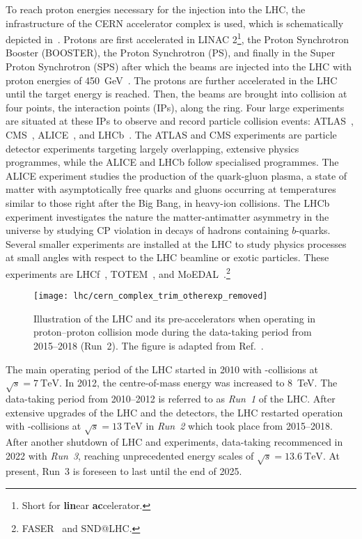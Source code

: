 To reach proton energies necessary for the injection into the LHC, the
infrastructure of the CERN accelerator complex is used, which is schematically
depicted in~. Protons are first accelerated
in LINAC 2\footnote{Short for \textbf{lin}ear \textbf{ac}celerator.}, the Proton
Synchrotron Booster (BOOSTER), the Proton Synchrotron (PS), and finally in the
Super Proton Synchrotron (SPS) after which the beams are injected into the LHC
with proton energies of \SI{450}{\GeV}~\cite{Evans:2008zzb}. The protons are
further accelerated in the LHC until the target energy is reached. Then, the
beams are brought into collision at four points, the interaction points (IPs),
along the ring. Four large experiments are situated at these IPs to observe and
record particle collision events: ATLAS~\cite{PERF-2007-01},
CMS~\cite{CMS-CMS-00-001}, ALICE~\cite{ALICE:2008ngc}, and
LHCb~\cite{LHCb:2008vvz}. The ATLAS and CMS experiments are particle detector
experiments targeting largely overlapping, extensive physics programmes, while
the ALICE and LHCb follow specialised programmes. The ALICE experiment studies
the production of the quark-gluon plasma, a state of matter with asymptotically
free quarks and gluons occurring at temperatures similar to those right after
the Big Bang, in heavy-ion collisions. The LHCb experiment investigates the
nature the matter-antimatter asymmetry in the universe by studying CP violation
in decays of hadrons containing $b$-quarks. Several smaller experiments are
installed at the LHC to study physics processes at small angles with respect to
the LHC beamline or exotic particles. These experiments are
LHCf~\cite{LHCf:2008lfy}, TOTEM~\cite{TOTEM:2008lue}, and
MoEDAL~\cite{MoEDAL:2009jwa}.\footnote{FASER~\cite{FASER:2019aik} and SND@LHC.}

\begin{figure}[htbp]
  \centering

  \texttt{[image: lhc/cern\_complex\_trim\_otherexp\_removed]}

  \caption{Illustration of the LHC and its pre-accelerators when operating in
    proton--proton collision mode during the data-taking period from 2015--2018
    (Run~2). The figure is adapted from Ref.~\cite{Mobs:2684277}.}%
  \label{fig:cern_accelerator_complex}
\end{figure}

The main operating period of the LHC started in 2010 with \pp-collisions at
$\sqrt{s} = \SI{7}{\TeV}$. In 2012, the centre-of-mass energy was increased to
\SI{8}{\TeV}. The data-taking period from 2010--2012 is referred to as
\emph{Run~1} of the LHC. After extensive upgrades of the LHC and the detectors,
the LHC restarted operation with \pp-collisions at $\sqrt{s} = \SI{13}{\TeV}$ in
\emph{Run~2} which took place from 2015--2018. After another shutdown of LHC and
experiments, data-taking recommenced in 2022 with \emph{Run~3}, reaching
unprecedented energy scales of $\sqrt{s} = \SI{13.6}{\TeV}$. At present, Run~3
is foreseen to last until the end of 2025.

